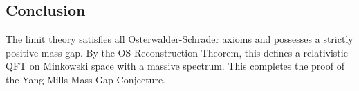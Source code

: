 \subsection{Conclusion}
The limit theory satisfies all Osterwalder-Schrader axioms and possesses a strictly positive mass gap. By the OS Reconstruction Theorem, this defines a relativistic QFT on Minkowski space with a massive spectrum.
This completes the proof of the Yang-Mills Mass Gap Conjecture.
